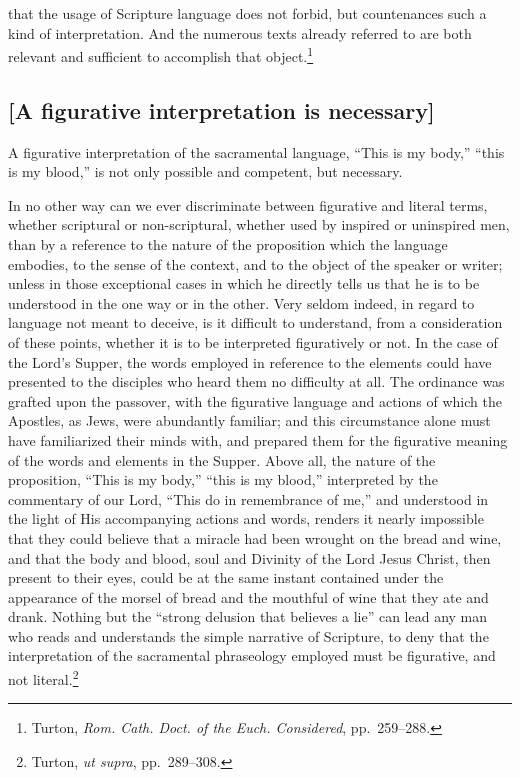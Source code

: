 \documentclass[
  english,
]{book}
\begin{document}
that the usage of Scripture language does not forbid, but countenances such a kind of interpretation. And the numerous texts already referred to are both relevant and sufficient to accomplish that object.\footnote{Turton, \emph{Rom. Cath. Doct. of the Euch. Considered}, pp.~259--288.}

\hypertarget{a-figurative-interpretation-is-necessary}{%
\subsection{{[}A figurative interpretation is necessary{]}}\label{a-figurative-interpretation-is-necessary}}

A figurative interpretation of the sacramental language, ``This is my body,'' ``this is my blood,'' is not only possible and competent, but necessary.

In no other way can we ever discriminate between figurative and literal terms, whether scriptural or non-scriptural, whether used by inspired or uninspired men, than by a reference to the nature of the proposition which the language embodies, to the sense of the context, and to the object of the speaker or writer; unless in those exceptional cases in which he directly tells us that he is to be understood in the one way or in the other. Very seldom indeed, in regard to language not meant to deceive, is it difficult to understand, from a consideration of these points, whether it is to be interpreted figuratively or not. In the case of the Lord's Supper, the words employed in reference to the elements could have presented to the disciples who heard them no difficulty at all. The ordinance was grafted upon the passover, with the figurative language and actions of which the Apostles, as Jews, were abundantly familiar; and this circumstance alone must have familiarized their minds with, and prepared them for the figurative meaning of the words and elements in the Supper. Above all, the nature of the proposition, ``This is my body,'' ``this is my blood,'' interpreted by the commentary of our Lord, ``This do in remembrance of me,'' and understood in the light of His accompanying actions and words, renders it nearly impossible that they could believe that a miracle had been wrought on the bread and wine, and that the body and blood, soul and Divinity of the Lord Jesus Christ, then present to their eyes, could be at the same instant contained under the appearance of the morsel of bread and the mouthful of wine that they ate and drank. Nothing but the ``strong delusion that believes a lie'' can lead any man who reads and understands the simple narrative of Scripture, to deny that the interpretation of the sacramental phraseology employed must be figurative, and not literal.\footnote{Turton, \emph{ut supra}, pp.~289--308.}
\end{document}
